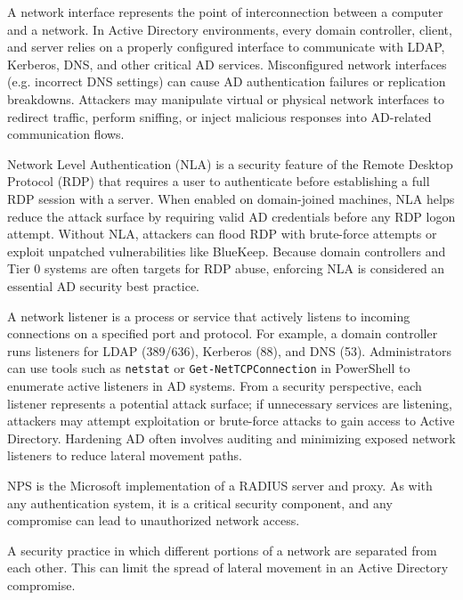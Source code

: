  A network interface represents the point of interconnection between a computer and a network. In Active Directory environments, every domain controller, client, and server relies on a properly configured interface to communicate with LDAP, Kerberos, DNS, and other critical AD services. Misconfigured network interfaces (e.g. incorrect DNS settings) can cause AD authentication failures or replication breakdowns. Attackers may manipulate virtual or physical network interfaces to redirect traffic, perform sniffing, or inject malicious responses into AD-related communication flows.

 Network Level Authentication (NLA) is a security feature of the Remote Desktop Protocol (RDP) that requires a user to authenticate before establishing a full RDP session with a server. When enabled on domain-joined machines, NLA helps reduce the attack surface by requiring valid AD credentials before any RDP logon attempt. Without NLA, attackers can flood RDP with brute-force attempts or exploit unpatched vulnerabilities like BlueKeep. Because domain controllers and Tier 0 systems are often targets for RDP abuse, enforcing NLA is considered an essential AD security best practice.

 A network listener is a process or service that actively listens to incoming connections on a specified port and protocol. For example, a domain controller runs listeners for LDAP (389/636), Kerberos (88), and DNS (53). Administrators can use tools such as \texttt{netstat} or \texttt{Get-NetTCPConnection} in PowerShell to enumerate active listeners in AD systems. From a security perspective, each listener represents a potential attack surface; if unnecessary services are listening, attackers may attempt exploitation or brute-force attacks to gain access to Active Directory. Hardening AD often involves auditing and minimizing exposed network listeners to reduce lateral movement paths.

 NPS is the Microsoft implementation of a RADIUS server and proxy. As with any authentication system, it is a critical security component, and any compromise can lead to unauthorized network access.

 A security practice in which different portions of a network are separated from each other. This can limit the spread of lateral movement in an Active Directory compromise.

